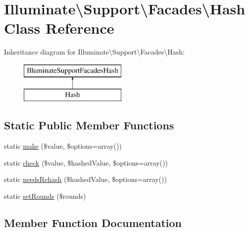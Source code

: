 \hypertarget{class_illuminate_1_1_support_1_1_facades_1_1_hash}{}\section{Illuminate\textbackslash{}Support\textbackslash{}Facades\textbackslash{}Hash Class Reference}
\label{class_illuminate_1_1_support_1_1_facades_1_1_hash}
Inheritance diagram for Illuminate\textbackslash{}Support\textbackslash{}Facades\textbackslash{}Hash\+:\begin{figure}[H]
\begin{center}
\leavevmode
\includegraphics[height=2.000000cm]{class_illuminate_1_1_support_1_1_facades_1_1_hash}
\end{center}
\end{figure}
\subsection*{Static Public Member Functions}
\begin{DoxyCompactItemize}
\item 
static \mbox{\hyperlink{class_illuminate_1_1_support_1_1_facades_1_1_hash_a2a88de88b45fd70857e473c60f0fde51}{make}} (\$value, \$options=array())
\item 
static \mbox{\hyperlink{class_illuminate_1_1_support_1_1_facades_1_1_hash_a4ba83167d6c76b82e6c94b72f2802954}{check}} (\$value, \$hashed\+Value, \$options=array())
\item 
static \mbox{\hyperlink{class_illuminate_1_1_support_1_1_facades_1_1_hash_ace976714a3948b960436eda1da612e3e}{needs\+Rehash}} (\$hashed\+Value, \$options=array())
\item 
static \mbox{\hyperlink{class_illuminate_1_1_support_1_1_facades_1_1_hash_afef6050dcab61a16445707787228a2de}{set\+Rounds}} (\$rounds)
\end{DoxyCompactItemize}


\subsection{Member Function Documentation}
\mbox{\label{class_illuminate_1_1_support_1_1_facades_1_1_hash_a4ba83167d6c76b82e6c94b72f2802954}} 
